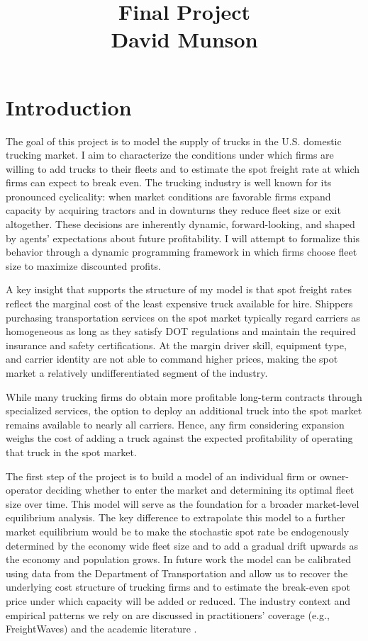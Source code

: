\documentclass[12pt]{article}
\title{Final Project \\ \vspace{0.5em} David Munson}
\begin{document}
	
	\maketitle
	
	\section{Introduction}
	
	\indent The goal of this project is to model the supply of trucks in the U.S. domestic trucking market. I aim to characterize the conditions under which firms are willing to add trucks to their fleets and to estimate the spot freight rate at which firms can expect to break even. The trucking industry is well known for its pronounced cyclicality: when market conditions are favorable firms expand capacity by acquiring tractors and in downturns they reduce fleet size or exit altogether. These decisions are inherently dynamic, forward-looking, and shaped by agents’ expectations about future profitability. I will attempt to formalize this behavior through a dynamic programming framework in which firms choose fleet size to maximize discounted profits.
	
	\indent A key insight that supports the structure of my model is that spot freight rates reflect the marginal cost of the least expensive truck available for hire. Shippers purchasing transportation services on the spot market typically regard carriers as homogeneous as long as they satisfy DOT regulations and maintain the required insurance and safety certifications. At the margin driver skill, equipment type, and carrier identity are not able to command higher prices, making the spot market a relatively undifferentiated segment of the industry.
	
	While many trucking firms do obtain more profitable long-term contracts through specialized services, the option to deploy an additional truck into the spot market remains available to nearly all carriers. Hence, any firm considering expansion weighs the cost of adding a truck against the expected profitability of operating that truck in the spot market.
	
	The first step of the project is to build a model of an individual firm or owner-operator deciding whether to enter the market and determining its optimal fleet size over time. This model will serve as the foundation for a broader market-level equilibrium analysis. The key difference to extrapolate this model to a further market equilibrium would be to make the stochastic spot rate be endogenously determined by the economy wide fleet size and to add a gradual drift upwards as the economy and population grows. In future work the model can be calibrated using data from the Department of Transportation and allow us to recover the underlying cost structure of trucking firms and to estimate the break-even spot price under which capacity will be added or reduced. The industry context and empirical patterns we rely on are discussed in practitioners' coverage (e.g., FreightWaves) and the academic literature \citep{freightwaves2025,harris2023long,miller2018arima}.
	
\end{document}
